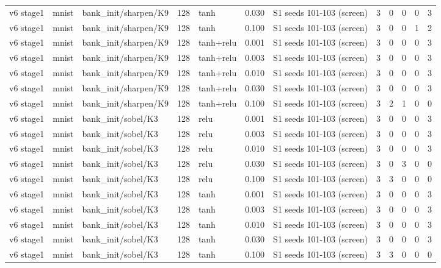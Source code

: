 \begin{table}[htbp]
{\begin{tabular}{@{}lllrlrlrrrrr@{}}
v6 stage1 & mnist & bank\_init/sharpen/K9 & 128 & tanh & 0.030 & S1 seeds 101-103 (screen) & 3 & 0 & 0 & 0 & 3 \\
v6 stage1 & mnist & bank\_init/sharpen/K9 & 128 & tanh & 0.100 & S1 seeds 101-103 (screen) & 3 & 0 & 0 & 1 & 2 \\
v6 stage1 & mnist & bank\_init/sharpen/K9 & 128 & tanh+relu & 0.001 & S1 seeds 101-103 (screen) & 3 & 0 & 0 & 0 & 3 \\
v6 stage1 & mnist & bank\_init/sharpen/K9 & 128 & tanh+relu & 0.003 & S1 seeds 101-103 (screen) & 3 & 0 & 0 & 0 & 3 \\
v6 stage1 & mnist & bank\_init/sharpen/K9 & 128 & tanh+relu & 0.010 & S1 seeds 101-103 (screen) & 3 & 0 & 0 & 0 & 3 \\
v6 stage1 & mnist & bank\_init/sharpen/K9 & 128 & tanh+relu & 0.030 & S1 seeds 101-103 (screen) & 3 & 0 & 0 & 0 & 3 \\
v6 stage1 & mnist & bank\_init/sharpen/K9 & 128 & tanh+relu & 0.100 & S1 seeds 101-103 (screen) & 3 & 2 & 1 & 0 & 0 \\
v6 stage1 & mnist & bank\_init/sobel/K3 & 128 & relu & 0.001 & S1 seeds 101-103 (screen) & 3 & 0 & 0 & 0 & 3 \\
v6 stage1 & mnist & bank\_init/sobel/K3 & 128 & relu & 0.003 & S1 seeds 101-103 (screen) & 3 & 0 & 0 & 0 & 3 \\
v6 stage1 & mnist & bank\_init/sobel/K3 & 128 & relu & 0.010 & S1 seeds 101-103 (screen) & 3 & 0 & 0 & 0 & 3 \\
v6 stage1 & mnist & bank\_init/sobel/K3 & 128 & relu & 0.030 & S1 seeds 101-103 (screen) & 3 & 0 & 3 & 0 & 0 \\
v6 stage1 & mnist & bank\_init/sobel/K3 & 128 & relu & 0.100 & S1 seeds 101-103 (screen) & 3 & 3 & 0 & 0 & 0 \\
v6 stage1 & mnist & bank\_init/sobel/K3 & 128 & tanh & 0.001 & S1 seeds 101-103 (screen) & 3 & 0 & 0 & 0 & 3 \\
v6 stage1 & mnist & bank\_init/sobel/K3 & 128 & tanh & 0.003 & S1 seeds 101-103 (screen) & 3 & 0 & 0 & 0 & 3 \\
v6 stage1 & mnist & bank\_init/sobel/K3 & 128 & tanh & 0.010 & S1 seeds 101-103 (screen) & 3 & 0 & 0 & 0 & 3 \\
v6 stage1 & mnist & bank\_init/sobel/K3 & 128 & tanh & 0.030 & S1 seeds 101-103 (screen) & 3 & 0 & 0 & 0 & 3 \\
v6 stage1 & mnist & bank\_init/sobel/K3 & 128 & tanh & 0.100 & S1 seeds 101-103 (screen) & 3 & 3 & 0 & 0 & 0 \\

\end{tabular}}
\end{table}
